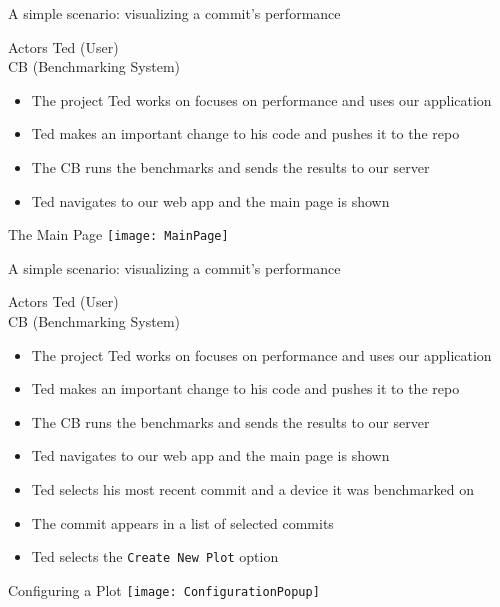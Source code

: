 \begin{frame}{A simple scenario: visualizing a commit's performance}
  \begin{block}{Actors}
    Ted (User)\\
    CB (Benchmarking System)
  \end{block}
  \begin{itemize}
    \item The project Ted works on focuses on performance and uses our application
    \item Ted makes an important change to his code and pushes it to the repo
    \item The CB runs the benchmarks and sends the results to our server
    \item Ted navigates to our web app and the main page is shown
  \end{itemize}
\end{frame}

\begin{frame}{The Main Page}
  \texttt{[image: MainPage]}
\end{frame}

\begin{frame}{A simple scenario: visualizing a commit's performance}
  \begin{block}{Actors}
    Ted (User)\\
    CB (Benchmarking System)
  \end{block}
  \begin{itemize}
    \item The project Ted works on focuses on performance and uses our application
    \item Ted makes an important change to his code and pushes it to the repo
    \item The CB runs the benchmarks and sends the results to our server
    \item Ted navigates to our web app and the main page is shown
    \item Ted selects his most recent commit and a device it was benchmarked on
    \item The commit appears in a list of selected commits
    \item Ted selects the \texttt{Create New Plot} option
  \end{itemize}
\end{frame}

\begin{frame}{Configuring a Plot}
  \texttt{[image: ConfigurationPopup]}
\end{frame}

